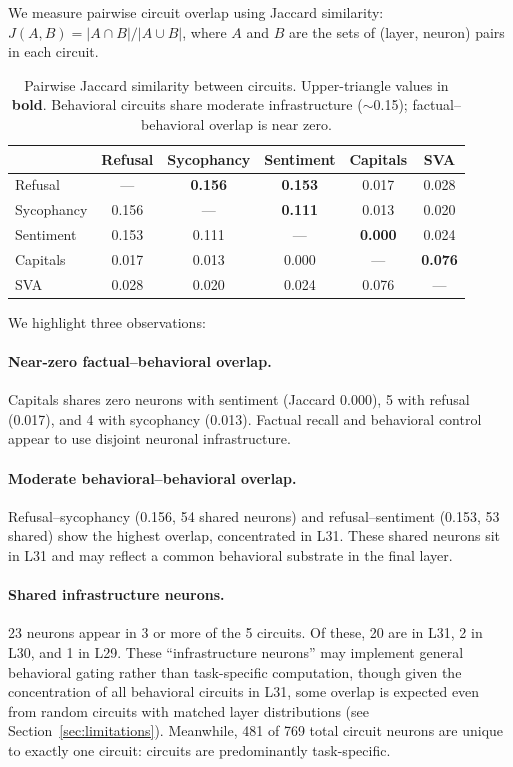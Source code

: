 \documentclass[11pt]{article}
\begin{document}
We measure pairwise circuit overlap using Jaccard similarity: $J(A, B) = |A \cap B| / |A \cup B|$, where $A$ and $B$ are the sets of (layer, neuron) pairs in each circuit.

\begin{table}[h]
\centering
\caption{Pairwise Jaccard similarity between circuits. Upper-triangle values in \textbf{bold}. Behavioral circuits share moderate infrastructure (${\sim}$0.15); factual--behavioral overlap is near zero.}
\label{tab:jaccard}
\small
\begin{tabular}{lccccc}
\toprule
& \textbf{Refusal} & \textbf{Sycophancy} & \textbf{Sentiment} & \textbf{Capitals} & \textbf{SVA} \\
\midrule
Refusal     & ---     & \textbf{0.156} & \textbf{0.153} & 0.017 & 0.028 \\
Sycophancy  & 0.156 & ---     & \textbf{0.111} & 0.013 & 0.020 \\
Sentiment   & 0.153 & 0.111 & ---     & \textbf{0.000} & 0.024 \\
Capitals    & 0.017 & 0.013 & 0.000 & ---     & \textbf{0.076} \\
SVA         & 0.028 & 0.020 & 0.024 & 0.076 & --- \\
\bottomrule
\end{tabular}
\end{table}

We highlight three observations:

\paragraph{Near-zero factual--behavioral overlap.}
Capitals shares zero neurons with sentiment (Jaccard 0.000), 5 with refusal (0.017), and 4 with sycophancy (0.013).
Factual recall and behavioral control appear to use disjoint neuronal infrastructure.

\paragraph{Moderate behavioral--behavioral overlap.}
Refusal--sycophancy (0.156, 54 shared neurons) and refusal--sentiment (0.153, 53 shared) show the highest overlap, concentrated in L31.
These shared neurons sit in L31 and may reflect a common behavioral substrate in the final layer.

\paragraph{Shared infrastructure neurons.}
23 neurons appear in 3 or more of the 5 circuits.
Of these, 20 are in L31, 2 in L30, and 1 in L29.
These ``infrastructure neurons'' may implement general behavioral gating rather than task-specific computation, though given the concentration of all behavioral circuits in L31, some overlap is expected even from random circuits with matched layer distributions (see Section~\ref{sec:limitations}).
Meanwhile, 481 of 769 total circuit neurons are unique to exactly one circuit: circuits are predominantly task-specific.
\end{document}
